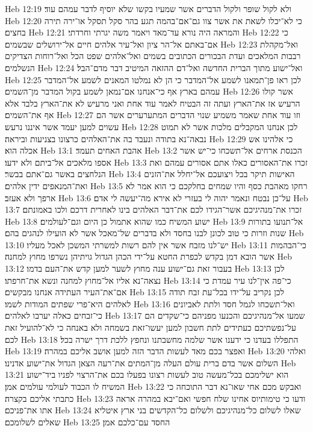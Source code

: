 Heb 12:19  ולא לקול שופר ולקול הדברים אשר שמעיו בקשו שלא יוסיף לדבר עמהם עוד׃
Heb 12:20  כי לא־יכלו לשאת את אשר צוו גם־אם־בהמה תגע בהר סקל תסקל או־ירה תירה בחצים׃
Heb 12:21  והמראה היה נורא עד־מאד ויאמר משה יגרתי וחרדתי׃
Heb 12:22  כי אם־באתם אל־הר ציון ואל־עיר אלהים חיים אל־ירושלים שבשמים׃
Heb 12:23  ואל־מקהלת רבבות המלאכים ועדת הבכורים הכתובים בשמים ואל־אלהים שפט הכל ואל־רוחות הצדיקים הנשלמים׃
Heb 12:24  ואל־ישוע מתוך הברית החדשה ואל־דם ההזאה המיטיב דבר מדם־הבל׃
Heb 12:25  לכן ראו פן־תמאנו לשמע אל־המדבר כי הן לא נמלטו המאנים לשמע אל־המדבר עמהם בארץ אף כי־אנחנו אם־נמאן לשמע בקול המדבר מן־השמים׃
Heb 12:26  אשר קולו הרעיש אז את־הארץ ועתה זה הבטיח לאמר עוד אחת ואני מרעיש לא את־הארץ בלבד אלא אף את־השמים׃
Heb 12:27  וזו עוד אחת שאמר משמיע שנוי הדברים המתערערים אשר הם עשוים למען יעמד אשר איננו נרעש׃
Heb 12:28  לכן אנחנו המקבלים מלכות אשר לא תמוט נבאה־נא בתודה ונעבד בה את־האלהים כרצונו בצניעות וביראה׃
Heb 12:29  כי אלהינו אש אכלה הוא׃
Heb 13:1  אהבת האחים תעמד׃
Heb 13:2  הכנסת ארחים אל־תשכחו כי־יש אשר אספו מלאכים אל־ביתם ולא ידעו׃
Heb 13:3  זכרו את־האסורים כאלו אתם אסורים עמהם ואת הנלחצים באשר גם־אתם בבשר׃
Heb 13:4  האישות תיקר בכל ויצועכם אל־יחלל את־הזנים ואת־המנאפים ידין אלהים׃
Heb 13:5  רחקו מאהבת כסף והיו שמחים בחלקכם כי הוא אמר לא ארפך ולא אעזב׃
Heb 13:6  על־כן נבטח ונאמר יהוה לי בעזרי לא אירא מה־יעשה לי אדם׃
Heb 13:7  זכרו את־מנהיגיכם אשר־הגידו לכם את־דבר האלהים בינו לאחרית דרכם ולכו באמונתם׃
Heb 13:8  ישוע המשיח כמו שהוא אתמול כן היום וגם־לעולמים׃
Heb 13:9  אל־תנועו בתורות שנות וזרות כי טוב לכונן לבנו בחסד ולא בדברים של־מאכל אשר לא הועילו לנהגים בהם׃
Heb 13:10  יש־לנו מזבח אשר אין להם רשות למשרתי המשכן לאכל מעליו׃
Heb 13:11  כי־הבהמות אשר הובא דמן בקדש לכפרת החטא על־ידי הכהן הגדול גויתיהן נשרפו מחוץ למחנה׃
Heb 13:12  בעבור זאת גם־ישוע ענה מחוץ לשער למען קדש את־העם בדמו׃
Heb 13:13  לכן נצאה־נא אליו אל־מחוץ למחנה ונשא את־חרפתו׃
Heb 13:14  כי־פה אין־לנו עיר עמדת כי אם־את־העיר העתידה אנחנו מבקשים׃
Heb 13:15  לכן נקריב על־ידו בכל־עת זבח תודה לאלהים היא־פרי שפתים המודות לשמו׃
Heb 13:16  ואל־תשכחו לגמל חסד ולתת לאביונים כי־זבחים כאלה יערבו לאלהים׃
Heb 13:17  שמעו אל־מנהיגיכם והכנעו מפניהם כי־שקדים הם על־נפשתיכם כעתידים לתת חשבון למען יעשו־זאת בשמחה ולא באנחה כי לא־להועיל זאת לכם׃
Heb 13:18  התפללו בעדנו כי ידענו אשר שלמה מחשבתנו ונחפץ ללכת דרך ישרה בכל׃
Heb 13:19  ואפצר בכם מאד לעשות הדבר הזה למען אושב אליכם במהרה׃
Heb 13:20  ואלהי השלום אשר בדם ברית עולם העלה מן־המתים את־רעה הצאן הגדול את־ישוע אדנינו׃
Heb 13:21  הוא ישלימכם בכל־מעשה טוב לעשות רצונו בפעלו בכם את־הרצוי לפניו ביד־ישוע המשיח לו הכבוד לעולמי עולמים אמן׃
Heb 13:22  ואבקש מכם אחי שאו־נא דבר התוכחה כי כתבתי אליכם בקצרה׃
Heb 13:23  ודעו כי טימותיוס אחינו שלח חפשי ואם־יבא במהרה אראה אתו את־פניכם׃
Heb 13:24  שאלו לשלום כל־מנהיגיכם ולשלום כל־הקדשים בני ארץ איטליא שאלים לשלומכם׃
Heb 13:25  החסד עם־כלכם אמן׃


